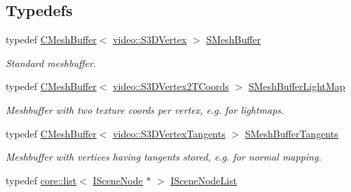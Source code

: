 \subsection*{Typedefs}
\begin{DoxyCompactItemize}
\item 
\mbox{\label{namespaceirr_1_1scene_ae74662460587fcb33d99e340bda3e826}} 
typedef \hyperlink{classirr_1_1scene_1_1CMeshBuffer}{C\+Mesh\+Buffer}$<$ \hyperlink{structirr_1_1video_1_1S3DVertex}{video\+::\+S3\+D\+Vertex} $>$ \hyperlink{namespaceirr_1_1scene_ae74662460587fcb33d99e340bda3e826}{S\+Mesh\+Buffer}
\begin{DoxyCompactList}\small\item\em Standard meshbuffer. \end{DoxyCompactList}\item 
\mbox{\label{namespaceirr_1_1scene_a967c0142db1c56b1bae4278ccd8607ba}} 
typedef \hyperlink{classirr_1_1scene_1_1CMeshBuffer}{C\+Mesh\+Buffer}$<$ \hyperlink{structirr_1_1video_1_1S3DVertex2TCoords}{video\+::\+S3\+D\+Vertex2\+T\+Coords} $>$ \hyperlink{namespaceirr_1_1scene_a967c0142db1c56b1bae4278ccd8607ba}{S\+Mesh\+Buffer\+Light\+Map}
\begin{DoxyCompactList}\small\item\em Meshbuffer with two texture coords per vertex, e.\+g. for lightmaps. \end{DoxyCompactList}\item 
\mbox{\label{namespaceirr_1_1scene_ab02394119e3f80aa6ff142d4057b03f8}} 
typedef \hyperlink{classirr_1_1scene_1_1CMeshBuffer}{C\+Mesh\+Buffer}$<$ \hyperlink{structirr_1_1video_1_1S3DVertexTangents}{video\+::\+S3\+D\+Vertex\+Tangents} $>$ \hyperlink{namespaceirr_1_1scene_ab02394119e3f80aa6ff142d4057b03f8}{S\+Mesh\+Buffer\+Tangents}
\begin{DoxyCompactList}\small\item\em Meshbuffer with vertices having tangents stored, e.\+g. for normal mapping. \end{DoxyCompactList}\item 
\mbox{\label{namespaceirr_1_1scene_ab2065e4af635dd5e257d0f9667d5a8d4}} 
typedef \hyperlink{classirr_1_1core_1_1list}{core\+::list}$<$ \hyperlink{classirr_1_1scene_1_1ISceneNode}{I\+Scene\+Node} $\ast$ $>$ \hyperlink{namespaceirr_1_1scene_ab2065e4af635dd5e257d0f9667d5a8d4}{I\+Scene\+Node\+List}

\end{DoxyCompactItemize}
